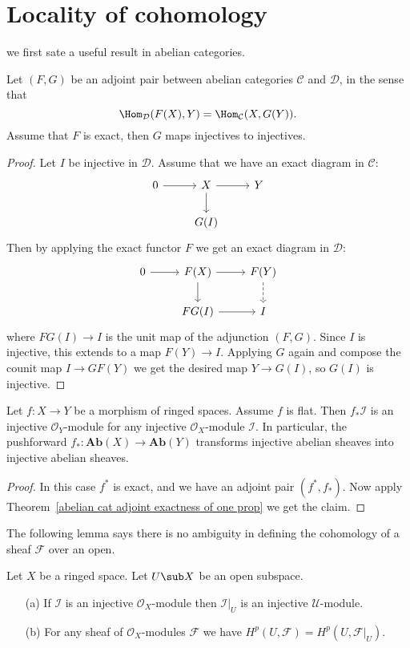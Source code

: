 \section{Locality of cohomology}
we first sate a useful result in abelian categories.
\begin{theorem}\label{abelian cat adjoint exactness of one prop}
Let $(F,G)$ be an adjoint pair between abelian categories $\mathcal{C}$ and $\mathcal{D}$, in the sense that
\[\Hom_{\mathcal{D}}(F(X),Y)=\Hom_\mathcal{C}(X,G(Y)).\]
Assume that $F$ is exact, then $G$ maps injectives to injectives.
\end{theorem}
\begin{proof}
Let $I$ be injective in $\mathcal{D}$. Assume that we have an exact diagram in $\mathcal{C}$:
\[\begin{tikzcd}
0\ar[r]&X\ar[r]\ar[d]&Y\\
&G(I)
\end{tikzcd}\]
Then by applying the exact functor $F$ we get an exact diagram in $\mathcal{D}$:
\[\begin{tikzcd}
0\ar[r]&F(X)\ar[r]\ar[d]&F(Y)\ar[d,dashed]\\
&FG(I)\ar[r]&I
\end{tikzcd}\]
where $FG(I)\to I$ is the unit map of the adjunction $(F,G)$. Since $I$ is injective, this extends to a map $F(Y)\to I$. Applying $G$ again and compose the counit map $I\to GF(Y)$ we get the desired map $Y\to G(I)$, so $G(I)$ is injective.
\end{proof}
\begin{proposition}
Let $f:X\to Y$ be a morphism of ringed spaces. Assume $f$ is flat. Then $f_*\mathscr{I}$ is an injective $\mathscr{O}_Y$-module for any injective $\mathscr{O}_X$-module $\mathscr{I}$. In particular, the pushforward $f_*:\mathbf{Ab}(X)\to\mathbf{Ab}(Y)$ transforms injective abelian sheaves into injective abelian sheaves.
\end{proposition}
\begin{proof}
In this case $f^*$ is exact, and we have an adjoint pair $(f^*,f_*)$. Now apply Theorem~\ref{abelian cat adjoint exactness of one prop} we get the claim.
\end{proof}
The following lemma says there is no ambiguity in defining the cohomology of a sheaf $\mathscr{F}$ over an open.
\begin{lemma}
Let $X$ be a ringed space. Let $U\sub X$ be an open subspace.
\begin{itemize}
\item[(a)] If $\mathscr{I}$ is an injective $\mathcal{O}_X$-module then $\mathscr{I}|_U$ is an injective $\mathcal{U}$-module.
\item[(b)] For any sheaf of $\mathcal{O}_X$-modules $\mathscr{F}$ we have $H^p(U,\mathscr{F})=H^p(U,\mathscr{F}|_U)$.
\end{itemize}
\end{lemma}
